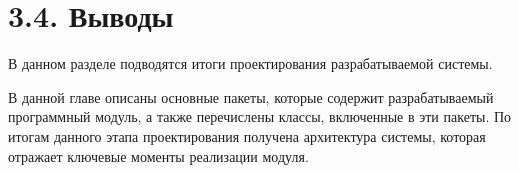 \section{3.4. Выводы}

В данном разделе подводятся итоги проектирования разрабатываемой системы.

В данной главе описаны основные пакеты, которые содержит разрабатываемый программный
модуль, а также перечислены классы, включенные в эти пакеты. По итогам данного этапа проектирования получена архитектура системы, которая отражает ключевые моменты реализации модуля.









